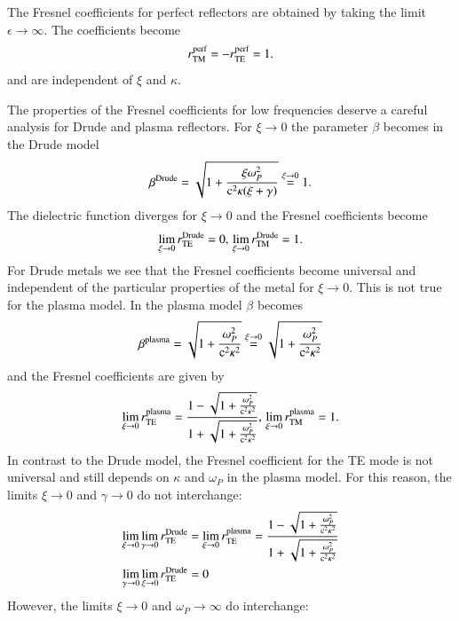 The Fresnel coefficients for perfect reflectors are obtained by taking the
limit $\epsilon\to\infty$. The coefficients become
\begin{equation}
r^\text{perf}_{\mathrm{TM}} = -r^\text{perf}_{\mathrm{TE}} = 1.
\end{equation}
and are independent of $\xi$ and $\kappa$.

The properties of the Fresnel coefficients for low frequencies deserve a
careful analysis for Drude and plasma reflectors. For $\xi\to0$ the parameter
$\beta$ becomes in the Drude model
\begin{equation}
\beta^\text{Drude} = \sqrt{1 + \frac{\xi \omega_P^2}{\mathrm{c}^2 \kappa (\xi+\gamma)}} \overset{\xi\to0}{=} 1.
\end{equation}
The dielectric function diverges for $\xi\to0$ and the Fresnel coefficients
become
\begin{equation}
\lim_{\xi\to0} r_{\mathrm{TE}}^\text{Drude} = 0, \\
\lim_{\xi\to0} r_{\mathrm{TM}}^\text{Drude} = 1.
\end{equation}
For Drude metals we see that the Fresnel coefficients become universal and
independent of the particular properties of the metal for $\xi\to0$. This is
not true for the plasma model. In the plasma model $\beta$ becomes
\begin{equation}
\beta^\text{plasma} = \sqrt{1+\frac{\omega_P^2}{\mathrm{c}^2\kappa^2}} \overset{\xi\to0}{=} \sqrt{1+\frac{\omega_P^2}{\mathrm{c}^2\kappa^2}}
\end{equation}
and the Fresnel coefficients are given by
\begin{equation}
\label{eq:drude_rteplasmaxi0}
\lim_{\xi\to0} r_{\mathrm{TE}}^\text{plasma} = \frac{1-\sqrt{1+\frac{\omega_P^2}{\mathrm{c}^2\kappa^2}}}{1+\sqrt{1+\frac{\omega_P^2}{\mathrm{c}^2\kappa^2}}}, \\
\lim_{\xi\to0} r_{\mathrm{TM}}^\text{plasma} = 1.
\end{equation}
In contrast to the Drude model, the Fresnel coefficient for the TE mode is not universal and
still depends on $\kappa$ and $\omega_P$ in the plasma model. For this reason, the limits
$\xi\to0$ and $\gamma\to0$ do not interchange:
\begin{align}
\lim_{\xi\to 0} \lim_{\gamma\to0} r_{\mathrm{TE}}^\text{Drude} &= \lim_{\xi\to 0} r_{\mathrm{TE}}^\text{plasma} = \frac{1-\sqrt{1+\frac{\omega_P^2}{\mathrm{c}^2\kappa^2}}}{1+\sqrt{1+\frac{\omega_P^2}{\mathrm{c}^2\kappa^2}}} \\
\lim_{\gamma\to0} \lim_{\xi\to 0} r_{\mathrm{TE}}^\text{Drude} &= 0
\end{align}
However, the limits $\xi\to0$ and $\omega_P\to\infty$ do interchange:
